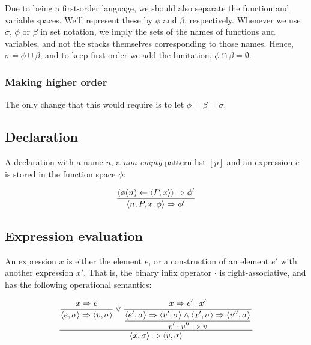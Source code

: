 Due to \D{} being a first-order language, we should also separate the function
and variable spaces. We'll represent these by $\phi$ and $\beta$, respectively.
Whenever we use $\sigma$, $\phi$ or $\beta$ in set notation, we imply the sets
of the names of functions and variables, and not the stacks themselves
corresponding to those names.  Hence, $\sigma=\phi\cup\beta$, and to keep \D{}
first-order we add the limitation, $\phi\cap\beta=\emptyset$.

\subsubsection{Making \D{} higher order}

The only change that this would require is to let $\phi=\beta=\sigma$.

\subsection{Declaration}

A declaration with a name $n$, a \emph{non-empty} pattern
list $[p]$ and an expression $e$ is stored in the function space $\phi$:

\begin{equation}\label{sem:declaration}
{\displaystyle
  \left\langle \phi(n)\leftarrow \left\langle P, x\right\rangle\right\rangle
  \Rightarrow
  \phi'
\over\displaystyle
  \left\langle n, P, x, \phi\right\rangle
  \Rightarrow
  \phi'
}
\end{equation}

\subsection{Expression evaluation}

An expression $x$ is either the element $e$, or a construction of an element
$e'$ with another expression $x'$. That is, the binary infix operator $\cdot$
is right-associative, and has the following operational semantics:

\everymath{\displaystyle}

\begin{equation}
{\displaystyle
{\displaystyle
  x\Rightarrow e
\over\displaystyle
  \left\langle e,\sigma\right\rangle
  \Rightarrow
  \left\langle v,\sigma\right\rangle
}
\vee
{\displaystyle
  x\Rightarrow e'\cdot x'
\over\displaystyle
{\displaystyle
  \left\langle e',\sigma\right\rangle
  \Rightarrow
  \left\langle v',\sigma\right\rangle
\wedge
  \left\langle x',\sigma\right\rangle
  \Rightarrow
  \left\langle v'',\sigma\right\rangle
\over\displaystyle
  v'\cdot v'' \Rightarrow v
}
}
\over\displaystyle
  \left\langle x,\sigma\right\rangle
  \Rightarrow
  \left\langle v,\sigma\right\rangle
}
\end{equation}


